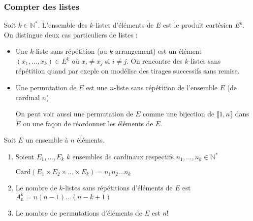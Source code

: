 \documentclass[a4paper,12pt]{book}
\newcommand{\Thr}[2]{\begin{tcolorbox}[sharp corners, colback=white,colframe=red!10!blue!30!green!75!, title=Théorème : #1]#2\end{tcolorbox}}
\def\N{\mathbb{N}}
\begin{document}
\subsubsection{Compter des listes}
Soit $k\in\N^*$. L'ensemble des $k$-listes d'éléments de $E$ est le produit cartésien $E^k$. On distingue deux cas particuliers de listes :\begin{itemize}
\item Une $k$-liste sans répétition (ou $k$-arrangement) est un élément $(x_1,...,x_k)\in E^k$ où $x_i\neq x_j$ si $i\neq j$. On rencontre des $k$-listes sans répétition quand par exeple on modélise des tirages successifs sans remise.
\item Une permutation de $E$ est une $n$-liste sans répétition de l'ensemble $E$ (de cardinal $n$)
\par On peut voir aussi une permutation de $E$ comme une bijection de $\llbracket 1,n\rrbracket$ dans $E$ ou une façon de réordonner les éléments de $E$.
\end{itemize}
\Thr{Nombre de listes}{Soit $E$ un ensemble à $n$ éléments.\begin{enumerate}
\item Soient $E_1,..., E_k$ $k$ ensembles de cardinaux respectifs $n_1,...,n_k\in\N^*$\par\begin{center}$\mathrm{Card}(E_1\times E_2\times...\times E_k)=n_1n_2...n_k$\end{center}
\item Le nombre de $k$-listes sans répétitions d'éléments de $E$ est $A_n^k = n(n-1)...(n-k+1)$
\item Le nombre de permutations d'éléments de $E$ est $n!$
\end{enumerate}}
\end{document}
